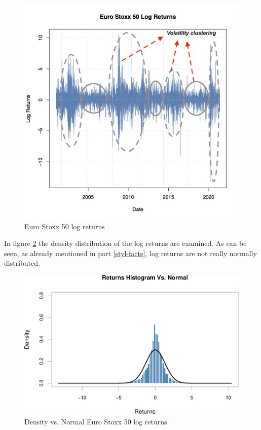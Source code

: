 \documentclass[a4paper, nobind]{templates/ociamthesis}
\begin{document}
\begin{figure}[h]

{\centering \includegraphics[width=0.7\linewidth]{figures/vol-clustering-finalized-RI} 

}

\caption{Euro Stoxx 50 log returns}\label{fig:plot2}
\end{figure}

\clearpage
\newpage

\noindent In figure \ref{fig:plot4} the density distribution of the log returns are examined. As can be seen, as already mentioned in part \ref{styl-facts}, log returns are not really normally distributed.

\begin{figure}[h]

{\centering \includegraphics[width=0.75\linewidth]{_main_files/figure-latex/plot4-1} 

}

\caption{Density vs. Normal Euro Stoxx 50 log returns}\label{fig:plot4}
\end{figure}
\end{document}
